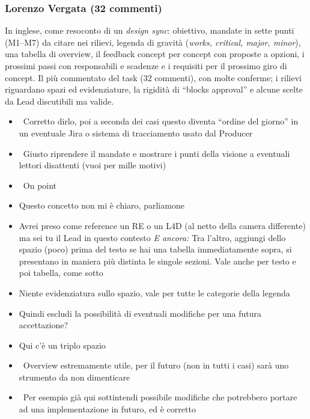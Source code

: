 \subsubsection{Lorenzo Vergata (32 commenti)}
In inglese, come resoconto di un \emph{design sync}: obiettivo, mandate in sette punti (M1--M7) da citare nei rilievi, legenda di gravità (\emph{works, critical, major, minor}), una tabella di overview, il feedback concept per concept con proposte a opzioni, i prossimi passi con responsabili e scadenze e i requisiti per il prossimo giro di concept. Il più commentato del task (32 commenti), con molte conferme; i rilievi riguardano spazi ed evidenziature, la rigidità di ``blocks approval'' e alcune scelte da Lead discutibili ma valide.
{\small
\begin{itemize}
  \item {} \rvBene\ Corretto dirlo, poi a seconda dei casi questo diventa ``ordine del giorno'' in un eventuale Jira o sistema di tracciamento usato dal Producer
  \item {} \rvBene\ Giusto riprendere il mandate e mostrare i punti della visione a eventuali lettori disattenti (vuoi per mille motivi)
  \item {} \rvBene\ On point
  \item {} Questo concetto non mi è chiaro, parliamone
  \item {} Avrei preso come reference un RE o un L4D (al netto della camera differente) ma sei tu il Lead in questo contesto \emph{E ancora:} Tra l'altro, aggiungi dello spazio (poco) prima del testo se hai una tabella immediatamente sopra, si presentano in maniera più distinta le singole sezioni. Vale anche per testo e poi tabella, come sotto
  \item \rvVuoto Niente evidenziatura sullo spazio, vale per tutte le categorie della legenda
  \item {} Quindi escludi la possibilità di eventuali modifiche per una futura accettazione?
  \item \rvVuoto Qui c'è un triplo spazio
  \item {} \rvBene\ Overview estremamente utile, per il futuro (non in tutti i casi) sarà uno strumento da non dimenticare
  \item {} \rvBene\ Per esempio già qui sottintendi possibile modifiche che potrebbero portare ad una implementazione in futuro, ed è corretto

\end{itemize}}
